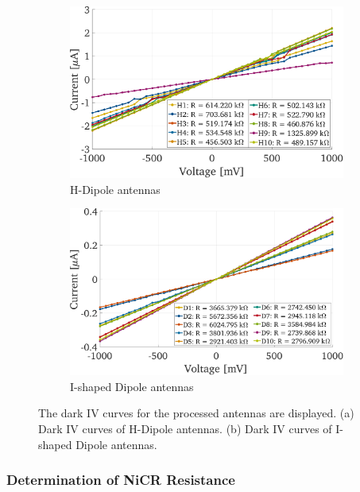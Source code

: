 \begin{figure}[!]
    \centering
    \begin{subfigure}[b]{0.49\textwidth}
        \centering
        \includegraphics[height=0.6\textwidth]{figures/IV_v3/IV_H_Dipoles.pdf}
        \caption{\centering
        H-Dipole antennas}
        \label{iv_HD}
    \end{subfigure}
    \hfill
    \begin{subfigure}[b]{0.49\textwidth}
        \centering
        \includegraphics[height=0.6\textwidth]{figures/IV_v3/IV_I_Dipoles.pdf}
        \caption{\centering
        I-shaped Dipole antennas}
        \label{iv_D}
    \end{subfigure}
    \caption{The dark IV curves for the processed antennas are displayed. (a) Dark IV curves of H-Dipole antennas. (b) Dark IV curves of I-shaped Dipole antennas.}
    \label{iv}
\end{figure}

\subsubsection{Determination of NiCR Resistance}

